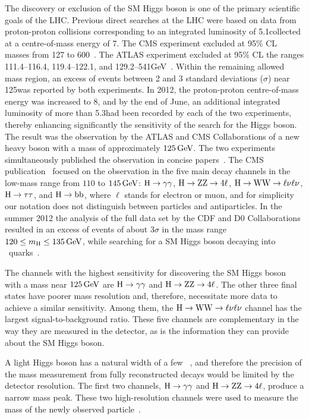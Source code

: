 \documentclass[12pt,twoside,a4paper,cmspaper,final,collab]{cms-tdr}
\begin{document}
The discovery or exclusion of the SM Higgs boson is one of the primary scientific goals of the LHC.
Previous direct searches at the LHC were based on data from proton-proton collisions corresponding to
an integrated luminosity of 5.1\fbinv collected at a centre-of-mass
energy of 7\TeV.
The CMS experiment excluded
at 95\% CL masses from 127 to 600\GeV~\cite{Chatrchyan:2012tx}.
The ATLAS experiment excluded at 95\% CL the ranges 111.4--116.4,
119.4--122.1, and 129.2--541\unit{GeV}~\cite{ATLAScombJul2012_7TeV}.
Within the remaining allowed mass region, an excess of events between
2 and 3 standard deviations ($\sigma$) near
125\GeV was reported by both experiments.
In 2012, the proton-proton centre-of-mass energy was increased to 8\TeV, and by the end of June,
an additional integrated luminosity of more than 5.3\fbinv had been
recorded by each of the two experiments,
thereby enhancing significantly the sensitivity of the search for the Higgs boson.
The result was the observation by the ATLAS and CMS Collaborations of a new heavy boson with a mass of approximately $125\,\text{Ge\hspace{-.08em}V}$.
The two experiments simultaneously published the observation in concise
papers~\cite{ATLASobservation125,CMSobservation125}. The CMS publication~\cite{CMSobservation125} focused
on the observation in the five main decay channels in the low-mass
range from
$110$ to $145\,\text{Ge\hspace{-.08em}V}$: $\mathrm{H} \to \gamma\gamma$, $\mathrm{H} \to \mathrm{Z} \mathrm{Z} \to 4\ell$, $\mathrm{H} \to \mathrm{W}\mathrm{W} \to
\ell\nu\ell\nu$, $\mathrm{H} \to \tau\tau$, and  $\mathrm{H} \to \mathrm{b}\mathrm{b}$, where  $\ell$ stands for electron or muon,
and for simplicity our notation does not distinguish
between particles and antiparticles.
In the summer 2012 the analysis of the full data set by the CDF and D0 Collaborations
resulted in an excess of events of about 3$\sigma$ in the mass
range $120 \le m_{\mathrm{H}} \le 135\,\text{Ge\hspace{-.08em}V}$, while searching for a SM Higgs boson
decaying into \cPqb\ quarks~\cite{PhysRevLett.109.071804}.

The channels with the highest sensitivity for discovering the SM Higgs boson
with a mass near $125\,\text{Ge\hspace{-.08em}V}$ are $\mathrm{H} \to \gamma\gamma$ and $\mathrm{H} \to \mathrm{Z}
\mathrm{Z} \to 4\ell$.
The other three final states have poorer mass resolution and, therefore, necessitate more data
to achieve a similar sensitivity.
Among them, the  $\mathrm{H} \to \mathrm{W}\mathrm{W} \to
\ell\nu\ell\nu$ channel has the largest signal-to-background ratio.
These five channels are complementary in the way they are measured in the detector, as is the
information they can provide about the SM Higgs boson.

A light Higgs boson has a natural width of a few \MeV~\cite{LHCHiggsCrossSectionWorkingGroup:2011ti},
and
therefore the precision of the mass measurement from fully
reconstructed decays would be limited
by the detector resolution.
The first two channels, $\mathrm{H} \to \gamma\gamma$ and $\mathrm{H} \to \mathrm{Z}\mathrm{Z} \to 4\ell$, produce a narrow mass
peak.
These two high-resolution channels were used to measure the mass of
the newly observed particle~\cite{CMSobservation125,ATLASobservation125}.
\end{document}
